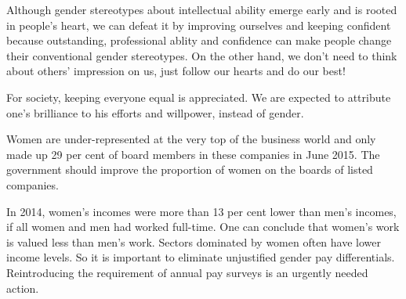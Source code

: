 \documentclass{article}
\begin{document}
Although gender stereotypes about intellectual ability emerge early and is rooted in people's heart, we can defeat it by improving ourselves and keeping confident because outstanding, professional ablity and confidence can make people change their conventional gender stereotypes. On the other hand, we don't need to think about others' impression on us, just follow our hearts and do our best! 

For society, keeping everyone equal is appreciated. We are expected to attribute one's brilliance to his efforts and willpower, instead of gender. 

Women are under-represented at the very top of the business world and only made up 29 per cent of board members in these companies in June 2015. The government should improve the proportion of women on the boards of listed companies. 

In 2014, women’s incomes were more than 13 per cent lower than men’s incomes, if all women and men had worked full-time. One can conclude that women’s work is valued less than men’s work. Sectors dominated by women often have lower income levels. So it is important to eliminate unjustified gender pay differentials. Reintroducing the requirement of annual pay surveys is an urgently needed action. 
\end{document}
